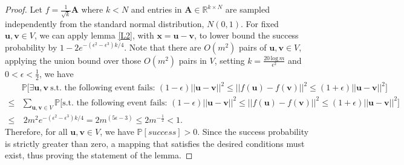 \documentclass[11pt]{article}
\begin{document}
\begin{proof}
Let $f=\frac{1}{\sqrt{k}}\textbf{A}$ where $k<N$ and entries in $\textbf{A}\in\mathbb{R}^{k\times N}$ are sampled independently from the standard normal distribution, $N(0,1)$. For fixed $\textbf{u}, \textbf{v}\in V$, we can apply lemma \ref{L2}, with $\textbf{x}=\textbf{u}-\textbf{v}$, to lower  bound the success probability by $1-2e^{-(\epsilon^2-\epsilon^3)k/4}$. Note that there are $O(m^2)$ pairs of $\textbf{u}, \textbf{v}\in V$, applying the union bound over those $O(m^2)$ pairs in $V$, setting $k=\frac{20\, \text{log}\, m}{\epsilon^2}$ and $0<\epsilon<\frac{1}{2}$, we have
\begin{equation*}
    \begin{aligned}
        & \mathbb{P}\Bigg[\exists \textbf{u},\textbf{v}\ \text{s.t. the following event fails: }(1-\epsilon)||\textbf{u}-\textbf{v}||^2 \leq ||f(\textbf{u})-f(\textbf{v})||^2 \leq (1+\epsilon)||\textbf{u}-\textbf{v}||^2\Bigg] \\
        \leq & \sum_{\textbf{u},\textbf{v}\in V} \mathbb{P}\Bigg[\text{s.t. the following event fails: }(1-\epsilon)||\textbf{u}-\textbf{v}||^2 \leq ||f(\textbf{u})-f(\textbf{v})||^2 \leq (1+\epsilon)||\textbf{u}-\textbf{v}||^2\Bigg] \\
        \leq &\ 2m^2e^{-(\epsilon^2-\epsilon^3)k/4} = 2m^{(5\epsilon-3)} \leq 2m^{-\frac{1}{2}} < 1.
    \end{aligned}
\end{equation*}
Therefore, for all $\textbf{u}, \textbf{v}\in V$, we have $\mathbb{P}[success]>0$. Since the success probability is strictly greater than zero, a mapping that satisfies the desired conditions must exist, thus proving the statement of the lemma. 
\end{proof}
\end{document}
